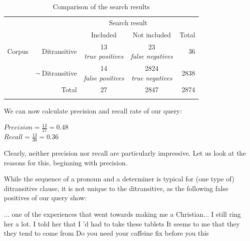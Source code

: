 \begin{table}[!htbp]
\caption{Comparison of the search results}
\label{tab:queryoutcomesexample}
\begin{tabular}[t]{lrccr}
\lsptoprule
       &         & \multicolumn{2}{c}{Search result} & \\
       &         & Included & Not included  & Total     \\
\midrule
Corpus  &  Ditransitive     & \makecell[t]{13 \\ \footnotesize{\textit{true positives}}}  &  \makecell[t]{23 \\ \footnotesize{\textit{false negatives}}} & 36 \\
        &  $\lnot$ Ditransitive & \makecell[t]{14 \\ \footnotesize{\textit{false positives}}}         &  \makecell[t]{2824 \\ \footnotesize{\textit{true negatives}}} & 2838 \\
\midrule
 & Total & 27 & 2847 & 2874 \\
\lspbottomrule
\end{tabular}
\end{table}

We can now calculate precision and recall rate of our query:

\begin{exe}
\ex
\begin{xlist} 
\label{ex:precisionrecallrate}
\ex $\displaystyle{Precision = \frac{13}{27} = 0.48}$\\
\ex $\displaystyle{Recall = \frac{13}{36} = 0.36}$ 
\end{xlist}
\end{exe}

Clearly, neither precision nor recall are particularly impressive. Let us look at the reasons for this, beginning with precision.

While the sequence of a pronoun and a determiner is typical for (one type of) ditransitive clause, it is not unique to the ditransitive, as the following false positives of our query show:

\begin{exe}
\ex
\begin{xlist} 
\label{ex:ditrfalsepositives}
\ex ... one of the experiences that went towards making me a Christian...
\ex I still ring her a lot.
\ex I told her that I 'd had to take these tablets
\ex It seems to me that they they tend to come from
\ex Do you need your caffeine fix before you this
\end{xlist}
\end{exe}

